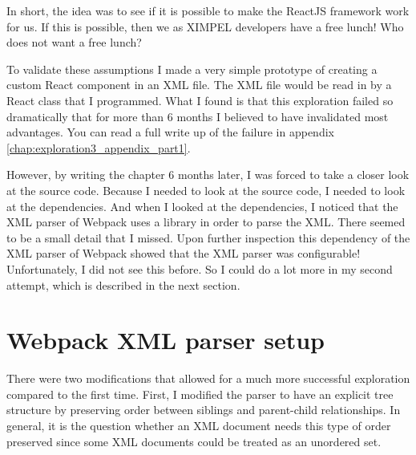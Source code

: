 
In short, the idea was to see if it is possible to make the ReactJS framework work for us. If this is possible, then we as XIMPEL developers have a free lunch! Who does not want a free lunch?



To validate these assumptions I made a very simple prototype of creating a custom React component in an XML file. The XML file would be read in by a React class that I programmed. What I found is that this exploration failed so dramatically that for more than 6 months I believed to have invalidated most advantages. You can read a full write up of the failure in appendix \ref{chap:exploration3_appendix_part1}.

However, by writing the chapter 6 months later, I was forced to take a closer look at the source code. Because I needed to look at the source code, I needed to look at the dependencies. And when I looked at the dependencies, I noticed that the XML parser of Webpack uses a library in order to parse the XML. There seemed to be a small detail that I missed. Upon further inspection this dependency of the XML parser of Webpack showed that the XML parser was configurable! Unfortunately, I did not see this before. So I could do a lot more in my second attempt, which is described in the next section.

\section{Webpack XML parser setup}
There were two modifications that allowed for a much more successful exploration compared to the first time. First, I modified the parser to have an explicit tree structure by preserving order between siblings and parent-child relationships. In general, it is the question whether an XML document needs this type of order preserved since some XML documents could be treated as an unordered set. 

